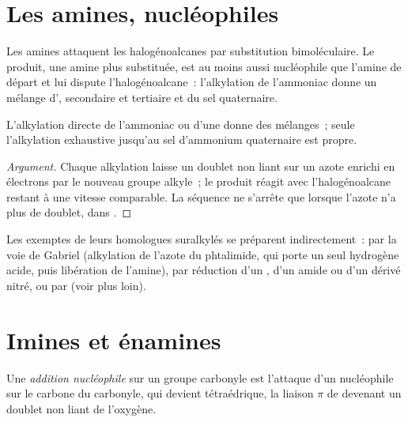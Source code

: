 \section{Les amines, nucléophiles}

Les amines attaquent les halogénoalcanes par substitution bimoléculaire. Le produit, une amine
plus substituée, est au moins aussi nucléophile que l'amine de départ et lui dispute
l'halogénoalcane~: l'alkylation de l'ammoniac donne un mélange d', secondaire et
tertiaire et du sel quaternaire.

\begin{proposition}[Polyalkylation]\label{prop:b2:amines:polyalkylation}
L'alkylation directe de l'ammoniac ou d'une  donne des mélanges~; seule
l'alkylation exhaustive jusqu'au sel d'ammonium quaternaire est propre.
\end{proposition}

\begin{proof}[Argument]
Chaque alkylation laisse un doublet non liant sur un azote enrichi en électrons par le nouveau
groupe alkyle~; le produit réagit avec l'halogénoalcane restant à une vitesse comparable. La
séquence ne s'arrête que lorsque l'azote n'a plus de doublet, dans .
\end{proof}

Les  exemptes de leurs homologues suralkylés se préparent indirectement~: par la
voie de Gabriel (alkylation de l'azote du phtalimide, qui porte un seul hydrogène acide, puis
libération de l'amine), par réduction d'un , d'un amide ou d'un dérivé nitré, ou par
 (voir plus loin).

\section{Imines et énamines}

\begin{definition}\label{def:b2:amines:nucleophilic-addition}
Une \emph{addition nucléophile} sur un groupe carbonyle est l'attaque
d'un nucléophile sur le carbone du carbonyle, qui devient tétraédrique, la liaison $\pi$ de 
devenant un doublet non liant de l'oxygène.
\end{definition}

